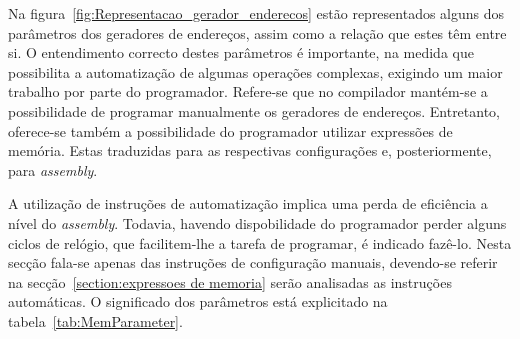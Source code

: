 Na figura~\ref{fig:Representacao_gerador_enderecos} estão representados alguns dos parâmetros dos geradores de endereços, assim como a relação que estes têm entre si.
O entendimento correcto destes parâmetros é importante, na medida que possibilita a automatização de algumas operações complexas, exigindo um maior trabalho por parte do programador.
Refere-se que no compilador mantém-se a possibilidade de programar manualmente os geradores de endereços. Entretanto, oferece-se também a possibilidade do programador 
utilizar expressões de memória. Estas traduzidas para as respectivas configurações e, posteriormente, para {\it assembly}. 

A utilização de instruções de automatização implica uma perda de eficiência a nível do {\it assembly}. Todavia, havendo dispobilidade do programador perder alguns ciclos de relógio, que facilitem-lhe a tarefa de programar, é indicado fazê-lo. 
Nesta secção fala-se apenas das instruções de configuração manuais, devendo-se referir na secção~\ref{section:expressoes de memoria} serão analisadas as instruções automáticas.
O significado dos parâmetros está explicitado na tabela~\ref{tab:MemParameter}.


